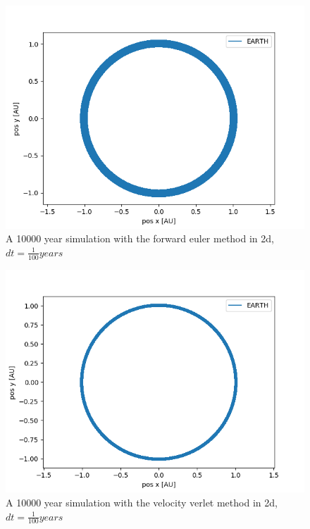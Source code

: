 \documentclass[a4paper]{article}
\begin{document}
\begin{figure}[h!]
	\centering 
	\includegraphics[scale=0.7]{fe1e4_2d.png}
	\caption{A 10000 year simulation with the forward euler method in 2d, $dt = \frac{1}{100}years$}
	\label{escape_vel}
\end{figure}
\begin{figure}[h!]
	\centering 
	\includegraphics[scale=0.7]{vv1e4_2d.png}
	\caption{A 10000 year simulation with the velocity verlet method in 2d, $dt = \frac{1}{100}years$}
	\label{computation time plot}
\end{figure}
\end{document}
